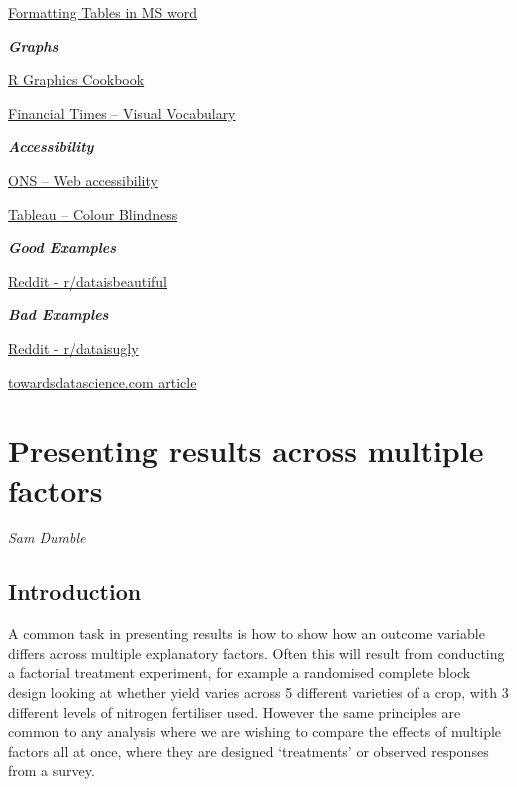 \documentclass[
  titlepage]{book}
\begin{document}
\href{http://www.docs.is.ed.ac.uk/skills/documents/3575/3575.pdf}{Formatting Tables in MS word}

\textbf{\emph{Graphs}}

\href{https://r-graphics.org/}{R Graphics Cookbook}

\href{https://github.com/ft-interactive/chart-doctor/blob/master/visual-vocabulary/Visual-vocabulary.pdf}{Financial Times -- Visual Vocabulary}

\textbf{\emph{Accessibility}}

\href{https://style.ons.gov.uk/writing-for-the-web/web-accessibility/introduction-3/}{ONS -- Web accessibility}

\href{https://www.tableau.com/about/blog/2016/4/examining-data-viz-rules-dont-use-red-green-together-53463}{Tableau -- Colour Blindness}

\textbf{\emph{Good Examples}}

\href{https://www.reddit.com/r/dataisbeautiful/}{Reddit - r/dataisbeautiful}

\textbf{\emph{Bad Examples}}

\href{https://www.reddit.com/r/dataisugly/}{Reddit - r/dataisugly}

\href{https://towardsdatascience.com/why-is-this-chart-bad-5f16da298afa}{towardsdatascience.com article}

\hypertarget{factor}{%
\chapter{Presenting results across multiple factors}\label{factor}}

\emph{Sam Dumble}

\hypertarget{introduction-1}{%
\section{Introduction}\label{introduction-1}}

A common task in presenting results is how to show how an outcome variable differs across multiple explanatory factors. Often this will result from conducting a factorial treatment experiment, for example a randomised complete block design looking at whether yield varies across 5 different varieties of a crop, with 3 different levels of nitrogen fertiliser used. However the same principles are common to any analysis where we are wishing to compare the effects of multiple factors all at once, where they are designed `treatments' or observed responses from a survey.
\end{document}
